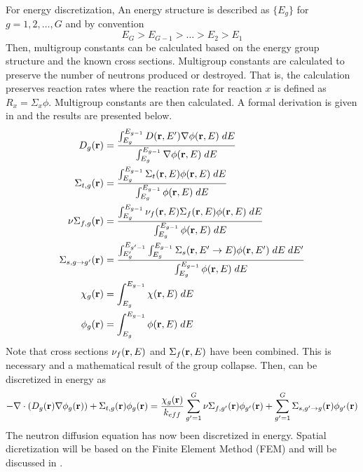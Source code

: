   For energy discretization, An energy structure is described as $\{E_g\}$ for 
  $g = 1,2,\ldots,G$ and by convention
  \[ E_G > E_{G-1} > \ldots > E_2 > E_1  \]
  Then, multigroup constants can be calculated based on the energy group 
  structure and the known cross sections. Multigroup constants are calculated to
  preserve the number of neutrons produced or destroyed. That is, the 
  calculation preserves reaction rates where the reaction rate for reaction $x$
  is defined as $R_x=\Sigma_x \phi$. Multigroup constants are then calculated. A
  formal derivation is given in \cite{duderstathamilton} and the results are 
  presented below.
  \begin{align}
    D_g(\mathbf{r}) &= \frac{\int_{E_g}^{E_{g-1}} D(\mathbf{r},E') \mathbf{\nabla} \phi(\mathbf{r},E)\;dE}
      {\int_{E_g}^{E_{g-1}} \mathbf{\nabla} \phi(\mathbf{r},E)\;dE} \\
    \Sigma_{t,g}(\mathbf{r}) &= \frac{\int_{E_g}^{E_{g-1}} \Sigma_t(\mathbf{r},E) 
      \phi(\mathbf{r},E)\;dE}{\int_{E_g}^{E_{g-1}} \phi(\mathbf{r},E)\;dE} \\
    \nu\Sigma_{f,g}(\mathbf{r}) &= \frac{\int_{E_g}^{E_{g-1}} \nu_f(\mathbf{r},E)
      \Sigma_f(\mathbf{r},E) \phi(\mathbf{r},E)\;dE}{\int_{E_g}^{E_{g-1}} 
      \phi(\mathbf{r},E)\;dE} \\
    \Sigma_{s,g\rightarrow g'}(\mathbf{r}) &= \frac{\int_{E_g'}^{E_{g'-1}} 
      \int_{E_g}^{E_{g-1}} \Sigma_s(\mathbf{r},E' \rightarrow E) \phi(\mathbf{r},E')\;dE\;dE'}
      {\int_{E_g}^{E_{g-1}} \phi(\mathbf{r},E)\;dE}  \\
    \chi_g(\mathbf{r}) &= \int_{E_g}^{E_{g-1}} \chi(\mathbf{r},E) \; dE \\
    \phi_g(\mathbf{r}) &= \int_{E_g}^{E_{g-1}} \phi(\mathbf{r},E) \; dE
  \end{align}
  Note that cross sections $\nu_f(\mathbf{r},E)$ and $\Sigma_f(\mathbf{r},E)$ have been 
  combined. This is necessary and a mathematical result of the group collapse.
  Then,  can be discretized in energy as
  \begin{align}\label{eq:multigroup_diffusion}
    - \mathbf{\nabla} \cdot ( D_g(\mathbf{r}) \mathbf{\nabla} \phi_g(\mathbf{r})) + \Sigma_{t,g}(\mathbf{r}) \phi_g(\mathbf{r})= 
      \frac{\chi_g(\mathbf{r})}{k_{eff}} \sum_{g'=1}^{G} \nu\Sigma_{f,g'}(\mathbf{r}) 
      \phi_{g'}(\mathbf{r}) + \sum_{g'=1}^{G} \Sigma_{s,g' \rightarrow g}(\mathbf{r}) 
      \phi_{g'}(\mathbf{r})
  \end{align}
  The neutron diffusion equation has now been discretized in energy.
  Spatial dicretization will be based on the Finite Element Method (FEM) and 
  will be discussed in .
  
